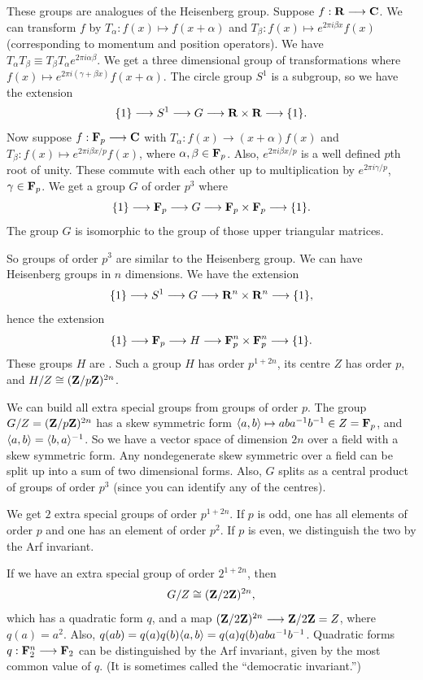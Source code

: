\documentclass[11pt, oneside]{amsart}
\begin{document}
These groups are analogues of the Heisenberg group. Suppose $f:\mathbf R\longrightarrow\mathbf C$. We can transform $f$ by $T_\alpha : f(x)\mapsto f(x+\alpha)$ and $T_\beta : f(x) \mapsto e^{2\pi i \beta x}f(x)$ (corresponding to momentum and position operators). We have $T_\alpha T_\beta \equiv T_\beta T_\alpha e^{2\pi i \alpha \beta}$. We get a three dimensional group of transformations where $f(x) \mapsto e^{2\pi i (\gamma + \beta x)} f(x+\alpha) $. The circle group $S^1$ is a subgroup, so we have the extension
$$
\{1 \} \longrightarrow S^1 \longrightarrow G \longrightarrow \mathbf R\times \mathbf R \longrightarrow \{1\}.
$$
Now suppose $f: \mathbf F_p \longrightarrow \mathbf C$ with $T_\alpha : f(x) \longrightarrow (x+\alpha)f(x)$ and $T_\beta : f(x) \mapsto e^{2\pi i \beta x/p} f(x)$, where $\alpha,\beta\in \mathbf F_p$. Also, $e^{2\pi i\beta x/p}$ is a well defined $p$th root of unity. These commute with each other up to multiplication by $e^{2\pi i \gamma/p}$, $\gamma\in \mathbf F_p$. We get a group $G$ of order $p^3$ where
$$
\{1\} \longrightarrow \mathbf F_p \longrightarrow G \longrightarrow \mathbf F_p\times \mathbf F_p\longrightarrow\{1\}.
$$
The group $G$ is isomorphic to the group of those upper triangular matrices. 

So groups of order $p^3$ are similar to the Heisenberg group. We can have Heisenberg groups in $n$ dimensions. We have the extension
$$
\{1\} \longrightarrow S^1 \longrightarrow G \longrightarrow \mathbf R^n \times \mathbf R^n \longrightarrow \{1\},
$$
hence the extension
$$
\{1\} \longrightarrow \mathbf F_p \longrightarrow H \longrightarrow \mathbf F_p^n \times \mathbf F_p^n \longrightarrow \{1\}.
$$
These groups $H$ are . Such a group $H$ has order $p^{1+2n}$, its centre $Z$ has order $p$, and $H/Z \cong (\mathbf Z / p\mathbf Z)^{2n}$.

We can build all extra special groups from groups of order $p$. The group $G/Z=(\mathbf Z / p\mathbf Z)^{2n}$ has a skew symmetric form $\langle a,b\rangle \mapsto aba^{-1} b^{-1}\in Z = \mathbf F_p$, and $\langle a,b\rangle =\langle b,a\rangle ^{-1}$. So we have a vector space of dimension $2n$ over a field with a skew symmetric form. Any nondegenerate skew symmetric over a field can be split up into a sum of two dimensional forms. Also, $G$ splits as a central product of groups of order $p^3$ (since you can identify any of the centres). 

We get $2$ extra special groups of order $p^{1+2n}$. If $p$ is odd, one has all elements of order $p$ and one has an element of order $p^2$. If $p$ is even, we distinguish the two by the Arf invariant.

If we have an extra special group of order $2^{1+2n}$, then 
$$
G/Z \cong (\mathbf Z / 2\mathbf Z)^{2n},
$$
which has a quadratic form $q$, and a map $(\mathbf Z / 2\mathbf Z)^{2n} \longrightarrow \mathbf Z / 2\mathbf Z = Z$, where $q(a) = a^2$. Also, $q(ab) = q(a)q(b)\langle a,b\rangle = q(a)q(b)aba^{-1} b^{-1}$. Quadratic forms $q : \mathbf F_2^n \longrightarrow \mathbf F_2$ can be distinguished by the Arf invariant, given by the most common value of $q$. (It is sometimes called the ``democratic invariant.'')
\end{document}
